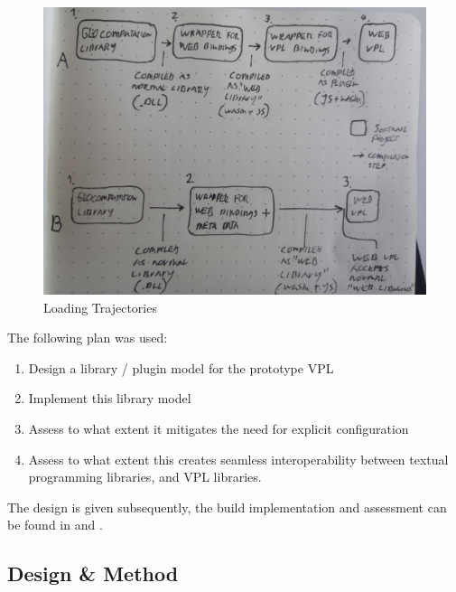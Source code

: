 \begin{figure}
  \centering
  \graphicspath{ {../../assets/images/4/} }
  \includegraphics[width=\linewidth]{loading-trajectory.png}
  \caption[Loading Trajectory]{Loading Trajectories}
  \label{fig:loading-trajectory}
\end{figure}


The following plan was used: 
\begin{enumerate}[-]
  \item Design a library / plugin model for the prototype VPL
  \item Implement this library model 
  \item Assess to what extent it mitigates the need for explicit configuration
  \item Assess to what extent this creates seamless interoperability between textual programming libraries, and VPL libraries.
\end{enumerate}

The design is given subsequently, the build implementation and assessment can be found in  and .

\subsection{Design \& Method}

